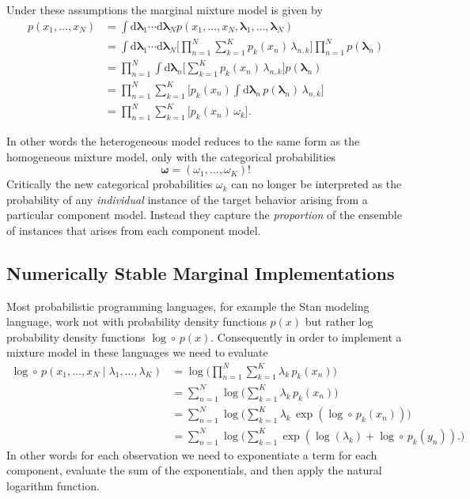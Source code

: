 \documentclass[
  letterpaper,
  DIV=11,
  numbers=noendperiod]{scrartcl}
\begin{document}
Under these assumptions the marginal mixture model is given by
\begin{align*}
p(x_{1}, \ldots, x_{N})
&=
\int \mathrm{d} \boldsymbol{\lambda}_{1} \cdots
     \mathrm{d} \boldsymbol{\lambda}_{N}
p(x_{1}, \ldots, x_{N},
  \boldsymbol{\lambda}_{1}, \ldots, \boldsymbol{\lambda}_{N})
\\
&=
\int \mathrm{d} \boldsymbol{\lambda}_{1} \cdots
     \mathrm{d} \boldsymbol{\lambda}_{N}
\bigg[
\prod_{n = 1}^{N} \sum_{k = 1}^{K} p_{k}(x_{n}) \, \lambda_{n, k}
\bigg]
\prod_{n = 1}^{N} p(\boldsymbol{\lambda}_{n})
\\
&=
\prod_{n = 1}^{N}
\int \mathrm{d} \boldsymbol{\lambda}_{n}
\bigg[
\sum_{k = 1}^{K} p_{k}(x_{n}) \, \lambda_{n, k}
\bigg]
p(\boldsymbol{\lambda}_{n})
\\
&=
\prod_{n = 1}^{N}
\sum_{k = 1}^{K} \bigg[ p_{k}(x_{n})
\int \mathrm{d} \boldsymbol{\lambda}_{n} \,
p(\boldsymbol{\lambda}_{n}) \, \lambda_{n, k} \bigg]
\\
&=
\prod_{n = 1}^{N}
\sum_{k = 1}^{K} \bigg[ p_{k}(x_{n}) \, \omega_{k} \bigg].
\end{align*}

In other words the heterogeneous model reduces to the same form as the
homogeneous mixture model, only with the categorical probabilities \[
\boldsymbol{\omega} = (\omega_{1}, \ldots, \omega_{K})!
\] Critically the new categorical probabilities \(\omega_{k}\) can no
longer be interpreted as the probability of any \emph{individual}
instance of the target behavior arising from a particular component
model. Instead they capture the \emph{proportion} of the ensemble of
instances that arises from each component model.

\subsection{Numerically Stable Marginal
Implementations}\label{sec:stable_impl}

Most probabilistic programming languages, for example the Stan modeling
language, work not with probability density functions \(p(x)\) but
rather log probability density functions \(\log \circ \, p (x)\).
Consequently in order to implement a mixture model in these languages we
need to evaluate \begin{align*}
\log \circ \, p  (x_{1}, \ldots, x_{N} \mid \lambda_{1}, \ldots, \lambda_{K})
&=
\log \bigg(
\prod_{n = 1}^{N} \sum_{k = 1}^{K} \lambda_{k} \, p_{k}(x_{n})
\bigg)
\\
&=
\sum_{n = 1}^{N}
\log \bigg( \sum_{k = 1}^{K} \lambda_{k} \, p_{k}(x_{n}) \bigg)
\\
&=
\sum_{n = 1}^{N}
\log \bigg(
\sum_{k = 1}^{K} \lambda_{k} \, \exp( \log \circ \, p_{k} (x_{n}) )
\bigg)
\\
&=
\sum_{n = 1}^{N}
\log \bigg(
\sum_{k = 1}^{K} \exp( \log(\lambda_{k}) + \log \circ \, p_{k} (y_{n}) ).
\bigg)
\end{align*} In other words for each observation we need to exponentiate
a term for each component, evaluate the sum of the exponentials, and
then apply the natural logarithm function.
\end{document}
